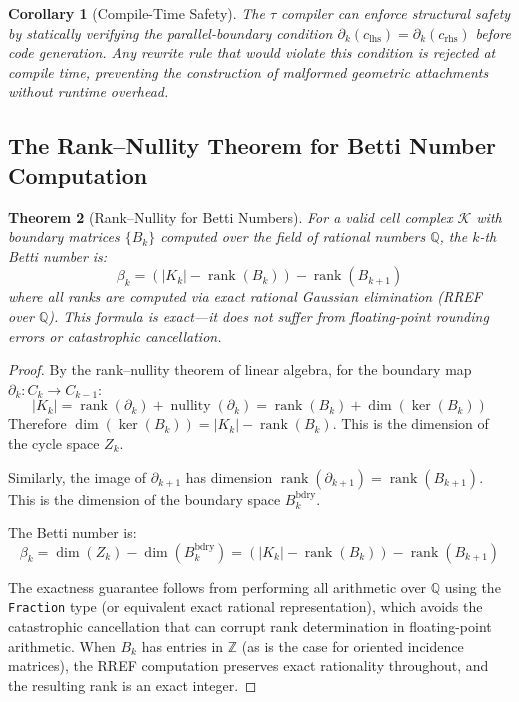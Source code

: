 \documentclass[manuscript, nonacm, review=false]{acmart}
\theoremstyle{definition}
\theoremstyle{plain}
\newtheorem{theorem}{Theorem}[section]
\newtheorem{corollary}[theorem]{Corollary}
\newcommand{\Z}{\mathbb{Z}}
\newcommand{\Q}{\mathbb{Q}}
\newcommand{\K}{\mathcal{K}}
\newcommand{\rank}{\operatorname{rank}}
\newcommand{\nullity}{\operatorname{nullity}}
\newcommand{\toposLang}{\ensuremath{\tau}\text{-Lang}}
\begin{document}
\begin{corollary}[Compile-Time Safety]
\label{cor:compile_safety}
The \toposLang{} compiler can enforce structural safety by statically verifying the parallel-boundary condition $\partial_k(c_{\text{lhs}}) = \partial_k(c_{\text{rhs}})$ before code generation. Any rewrite rule that would violate this condition is rejected at compile time, preventing the construction of malformed geometric attachments without runtime overhead.
\end{corollary}


\subsection{The Rank--Nullity Theorem for Betti Number Computation}
\label{subsec:rank_nullity}

\begin{theorem}[Rank--Nullity for Betti Numbers]
\label{thm:rank_nullity_betti}
For a valid cell complex $\K$ with boundary matrices $\{B_k\}$ computed over the field of rational numbers $\Q$, the $k$-th Betti number is:
\begin{equation}
    \beta_k = (|K_k| - \rank(B_k)) - \rank(B_{k+1})
\end{equation}
where all ranks are computed via exact rational Gaussian elimination (RREF over $\Q$). This formula is exact---it does not suffer from floating-point rounding errors or catastrophic cancellation.
\end{theorem}

\begin{proof}
By the rank--nullity theorem of linear algebra, for the boundary map $\partial_k: C_k \to C_{k-1}$:
\begin{equation}
    |K_k| = \rank(\partial_k) + \nullity(\partial_k) = \rank(B_k) + \dim(\ker(B_k))
\end{equation}
Therefore $\dim(\ker(B_k)) = |K_k| - \rank(B_k)$. This is the dimension of the cycle space $Z_k$.

Similarly, the image of $\partial_{k+1}$ has dimension $\rank(\partial_{k+1}) = \rank(B_{k+1})$. This is the dimension of the boundary space $B_k^{\text{bdry}}$.

The Betti number is:
\begin{equation}
    \beta_k = \dim(Z_k) - \dim(B_k^{\text{bdry}}) = (|K_k| - \rank(B_k)) - \rank(B_{k+1})
\end{equation}

The exactness guarantee follows from performing all arithmetic over $\Q$ using the \texttt{Fraction} type (or equivalent exact rational representation), which avoids the catastrophic cancellation that can corrupt rank determination in floating-point arithmetic. When $B_k$ has entries in $\Z$ (as is the case for oriented incidence matrices), the RREF computation preserves exact rationality throughout, and the resulting rank is an exact integer.
\end{proof}
\end{document}
